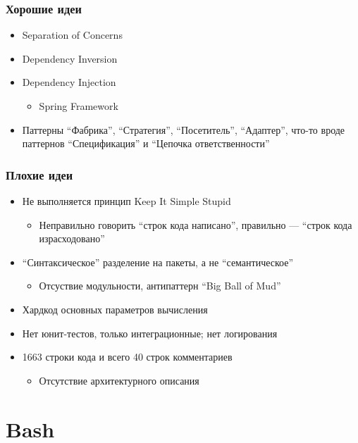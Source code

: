 \documentclass[xetex,mathserif,serif]{beamer}
\begin{document}
    \begin{frame}
        \frametitle{Хорошие идеи}
        \begin{itemize}
            \item Separation of Concerns
            \item Dependency Inversion
            \item Dependency Injection
            \begin{itemize}
                \item Spring Framework
            \end{itemize}
            \item Паттерны ``Фабрика'', ``Стратегия'', ``Посетитель'', ``Адаптер'', что-то вроде паттернов ``Спецификация'' и ``Цепочка ответственности''
        \end{itemize}
    \end{frame}

    \begin{frame}
        \frametitle{Плохие идеи}
        \begin{itemize}
            \item Не выполняется принцип Keep It Simple Stupid
            \begin{itemize}
                \item Неправильно говорить ``строк кода написано'', правильно --- ``строк кода израсходовано''
            \end{itemize}
            \item ``Синтаксическое'' разделение на пакеты, а не ``семантическое''
            \begin{itemize}
                \item Отсуствие модульности, антипаттерн ``Big Ball of Mud''
            \end{itemize}
            \item Хардкод основных параметров вычисления
            \item Нет юнит-тестов, только интеграционные; нет логирования
            \item 1663 строки кода и всего 40 строк комментариев
            \begin{itemize}
                \item Отсутствие архитектурного описания
            \end{itemize}
        \end{itemize}
    \end{frame}

    \section{Bash}
\end{document}
